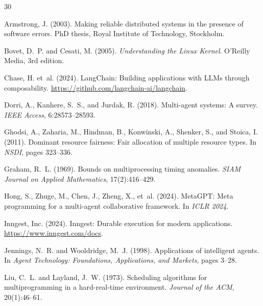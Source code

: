 \documentclass[12pt,a4paper]{article}
\theoremstyle{definition}
\theoremstyle{remark}
\begin{document}
\begin{thebibliography}{30}

Armstrong, J. (2003).
\newblock Making reliable distributed systems in the presence of software errors.
\newblock PhD thesis, Royal Institute of Technology, Stockholm.

Bovet, D.~P. and Cesati, M. (2005).
\newblock \emph{Understanding the Linux Kernel}.
\newblock O'Reilly Media, 3rd edition.

Chase, H. et~al. (2024).
\newblock LangChain: Building applications with LLMs through composability.
\newblock \url{https://github.com/langchain-ai/langchain}.

Dorri, A., Kanhere, S.~S., and Jurdak, R. (2018).
\newblock Multi-agent systems: A survey.
\newblock \emph{IEEE Access}, 6:28573--28593.

Ghodsi, A., Zaharia, M., Hindman, B., Konwinski, A., Shenker, S., and Stoica, I. (2011).
\newblock Dominant resource fairness: Fair allocation of multiple resource types.
\newblock In \emph{NSDI}, pages 323--336.

Graham, R.~L. (1969).
\newblock Bounds on multiprocessing timing anomalies.
\newblock \emph{SIAM Journal on Applied Mathematics}, 17(2):416--429.

Hong, S., Zhuge, M., Chen, J., Zheng, X., et~al. (2024).
\newblock MetaGPT: Meta programming for a multi-agent collaborative framework.
\newblock In \emph{ICLR 2024}.

Inngest, Inc. (2024).
\newblock Inngest: Durable execution for modern applications.
\newblock \url{https://www.inngest.com/docs}.

Jennings, N.~R. and Wooldridge, M.~J. (1998).
\newblock Applications of intelligent agents.
\newblock In \emph{Agent Technology: Foundations, Applications, and Markets}, pages 3--28.

Liu, C.~L. and Layland, J.~W. (1973).
\newblock Scheduling algorithms for multiprogramming in a hard-real-time environment.
\newblock \emph{Journal of the ACM}, 20(1):46--61.


\end{thebibliography}
\end{document}
